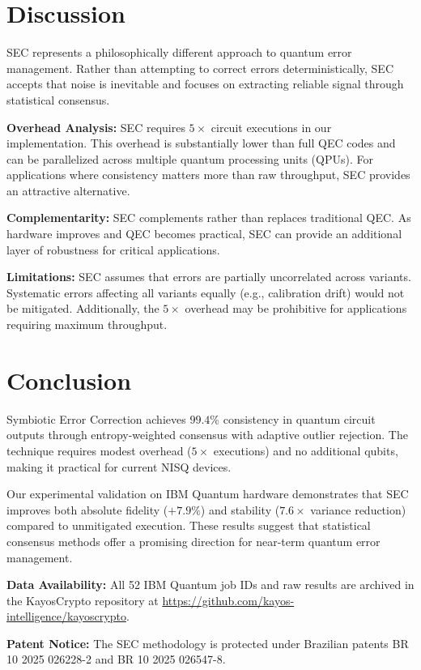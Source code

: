 \documentclass[twocolumn,preprintnumbers,amsmath,amssymb,prl]{revtex4-2}
\begin{document}
\section{Discussion}

SEC represents a philosophically different approach to quantum error management. Rather than attempting to correct errors deterministically, SEC accepts that noise is inevitable and focuses on extracting reliable signal through statistical consensus.

\textbf{Overhead Analysis:} SEC requires $5\times$ circuit executions in our implementation. This overhead is substantially lower than full QEC codes and can be parallelized across multiple quantum processing units (QPUs). For applications where consistency matters more than raw throughput, SEC provides an attractive alternative.

\textbf{Complementarity:} SEC complements rather than replaces traditional QEC. As hardware improves and QEC becomes practical, SEC can provide an additional layer of robustness for critical applications.

\textbf{Limitations:} SEC assumes that errors are partially uncorrelated across variants. Systematic errors affecting all variants equally (e.g., calibration drift) would not be mitigated. Additionally, the $5\times$ overhead may be prohibitive for applications requiring maximum throughput.

\section{Conclusion}

Symbiotic Error Correction achieves $99.4\%$ consistency in quantum circuit outputs through entropy-weighted consensus with adaptive outlier rejection. The technique requires modest overhead ($5\times$ executions) and no additional qubits, making it practical for current NISQ devices.

Our experimental validation on IBM Quantum hardware demonstrates that SEC improves both absolute fidelity ($+7.9\%$) and stability ($7.6\times$ variance reduction) compared to unmitigated execution. These results suggest that statistical consensus methods offer a promising direction for near-term quantum error management.

\textbf{Data Availability:} All 52 IBM Quantum job IDs and raw results are archived in the KayosCrypto repository at \url{https://github.com/kayos-intelligence/kayoscrypto}.

\textbf{Patent Notice:} The SEC methodology is protected under Brazilian patents BR 10 2025 026228-2 and BR 10 2025 026547-8.
\end{document}
